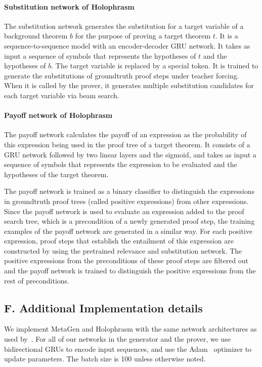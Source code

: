 \documentclass{article}
\begin{document}
\paragraph{Substitution network of Holophrasm}
The substitution network 
generates the substitution for a target variable 
of a background theorem $b$ 
for the purpose of proving a target theorem $t$.
It is a sequence-to-sequence model
with an encoder-decoder GRU network.
It takes as input a sequence of symbols 
that represents
 the hypotheses of $t$
and the hypotheses of 
$b$. The target variable is replaced by 
a special token.
It is trained to generate the substitutions of groundtruth proof steps under teacher forcing.
When it is called by the prover, it 
generates multiple substitution candidates for each target variable via beam search.

\paragraph{Payoff network of Holophrasm}
The payoff network calculates the payoff of an expression as  
the probability 
of this expression being used in the proof tree of a target theorem.
It consists of a GRU network
followed by two linear layers and the sigmoid,
and takes as input a sequence of symbols that represents the 
expression to be evaluated and the hypotheses of the target theorem.

The payoff network is trained as a binary classifier to distinguish the expressions in groundtruth proof trees (called positive expressions)
from other expressions. 
Since the payoff network is used to evaluate an expression added to the proof search tree, which is a precondition of a newly generated proof step, 
the training examples of the payoff network are generated in a similar way.
For each positive expression,
 proof steps 
that establish the entailment of this expression are constructed 
by using the pretrained relevance and substitution network.
The positive expressions from the preconditions of these proof steps are filtered out  
and the payoff network is trained to distinguish the positive expressions from the rest of preconditions.

\subsection*{F. Additional Implementation details}
\label{app:detail}

We implement MetaGen and Holophrasm with the same network architectures 
as used by~\cite{whalen2016holophrasm}.
For all of our networks in the generator and the prover, we use bidirectional GRUs to encode input sequences,
and use the Adam~\citep{kingma2014adam} optimizer to update parameters.
The batch size is 100 unless otherwise noted.
\end{document}
